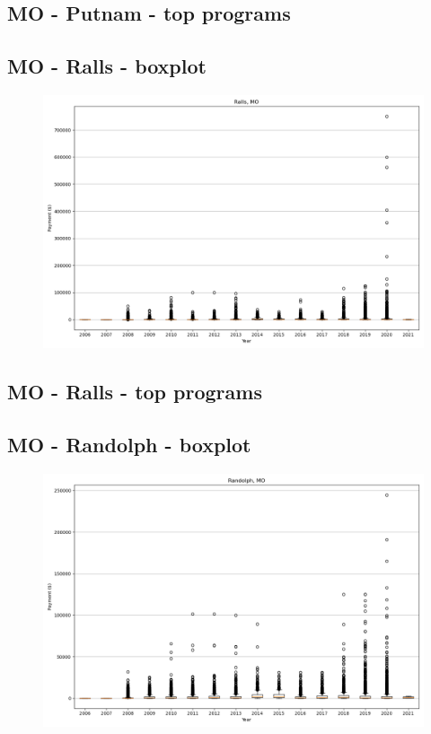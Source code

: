 \subsection*{MO - Putnam - top programs}

\newpage
\subsection*{MO - Ralls - boxplot}
\begin{figure}[h]
\centering
\includegraphics[width=7in]{../output/boxplots/counties/Ralls-MO_boxplot.png}
\end{figure}


\subsection*{MO - Ralls - top programs}

\newpage
\subsection*{MO - Randolph - boxplot}
\begin{figure}[h]
\centering
\includegraphics[width=7in]{../output/boxplots/counties/Randolph-MO_boxplot.png}
\end{figure}


